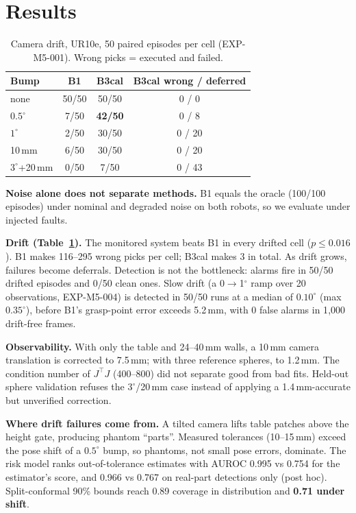 \documentclass[10pt,twocolumn]{article}
\begin{document}
\section{Results}
\begin{table}[t]\centering\small
\caption{Camera drift, UR10e, 50 paired episodes per cell (EXP-M5-001). Wrong picks = executed and failed.}
\begin{tabular}{lccc}\toprule
Bump & B1 & B3cal & B3cal wrong / deferred\\\midrule
none & 50/50 & 50/50 & 0 / 0\\
$0.5^\circ$ & 7/50 & \textbf{42/50} & 0 / 8\\
$1^\circ$ & 2/50 & 30/50 & 0 / 20\\
10\,mm & 6/50 & 30/50 & 0 / 20\\
$3^\circ$+20\,mm & 0/50 & 7/50 & 0 / 43\\\bottomrule
\end{tabular}\label{tab:drift}\end{table}

\textbf{Noise alone does not separate methods.} B1 equals the oracle (100/100 episodes) under nominal and degraded noise
on both robots, so we evaluate under injected faults.

\textbf{Drift (Table~\ref{tab:drift}).} The monitored system beats B1 in every drifted cell ($p\le0.016$). B1 makes
116--295 wrong picks per cell; B3cal makes 3 in total. As drift grows, failures become deferrals. Detection is not the
bottleneck: alarms fire in 50/50 drifted episodes and 0/50 clean ones. Slow drift (a 0$\to$1$^\circ$ ramp over 20
observations, EXP-M5-004) is detected in 50/50 runs at a median of $0.10^\circ$ (max $0.35^\circ$), before B1's
grasp-point error exceeds 5.2\,mm, with 0 false alarms in 1{,}000 drift-free frames.

\textbf{Observability.} With only the table and 24--40\,mm walls, a 10\,mm camera translation is corrected to 7.5\,mm;
with three reference spheres, to 1.2\,mm. The condition number of $J^\top J$ (400--800) did not separate good from bad
fits. Held-out sphere validation refuses the $3^\circ$/20\,mm case instead of applying a 1.4\,mm-accurate but unverified
correction.

\textbf{Where drift failures come from.} A tilted camera lifts table patches above the height gate, producing phantom
``parts''. Measured tolerances (10--15\,mm) exceed the pose shift of a $0.5^\circ$ bump, so phantoms, not small pose
errors, dominate. The risk model ranks out-of-tolerance estimates with AUROC 0.995 vs 0.754 for the estimator's
score, and 0.966 vs 0.767 on real-part detections only (post hoc). Split-conformal 90\% bounds reach 0.89 coverage in
distribution and \textbf{0.71 under shift}.
\end{document}
